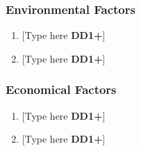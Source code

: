 \subsubsection{Environmental Factors}
\begin{enumerate}
    \item {[Type here \textbf{DD1+}]}
    \item {[Type here \textbf{DD1+}]}
\end{enumerate}

\subsubsection{Economical Factors}
\begin{enumerate}
    \item {[Type here \textbf{DD1+}]}
    \item {[Type here \textbf{DD1+}]}
\end{enumerate}